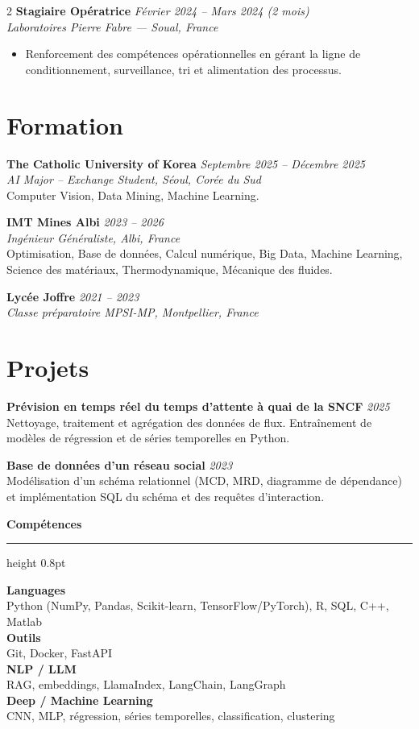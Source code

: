 \documentclass[10.5pt,a4paper]{article}
\newcommand{\sectionrule}{\vspace{-6pt}{\color{accent}\hrule height 1pt}\vspace{3pt}}
\newcommand{\subsectitle}[1]{%
  {\color{accent}\bfseries\large #1}\\[-2pt]
  {\color{accent}\hrule height 0.8pt}\vspace{4pt}
}
\newcommand{\cvexp}[5]{%
  \noindent\textbf{#1} \hfill {\itshape\color{graytext}\small #4}\\
  {\itshape #2 --- #3}\\[-2pt]
  #5
  \vspace{10pt}
}
\newcommand{\cvedu}[5]{%
  \noindent\textbf{#1} \hfill {\itshape\color{graytext}\small #4}\\
  {\itshape #2, #3}\\[1pt]
  {\small #5}
  \vspace{2pt}
}
\newcommand{\cveduplain}[4]{%
  \noindent\textbf{#1} \hfill {\itshape\color{graytext}\small #4}\\
  {\itshape #2, #3}
  \vspace{2pt}
}
\newcommand{\cvproject}[3]{%
  \noindent\textbf{#1} \hfill {\itshape\color{graytext}\small #2}\\[1pt]
  {\small #3}
  \vspace{3pt}
}
\newcommand{\sidebarline}[2]{%
  \noindent\textbf{\small #1}\\
  {\small #2}\\[3pt]
}
\begin{document}
\begin{paracol}{2}
\cvexp{Stagiaire Opératrice}{Laboratoires Pierre Fabre}{Soual, France}{Février 2024 -- Mars 2024 (2 mois)}{%
  \begin{itemize}[leftmargin=12pt, itemsep=2pt, topsep=0pt, partopsep=0pt, parsep=0pt]
    \item Renforcement des compétences opérationnelles en gérant la ligne de conditionnement, surveillance, tri et alimentation des processus.
  \end{itemize}
}

\section*{Formation}
\sectionrule

\cvedu{The Catholic University of Korea}{AI Major -- Exchange Student}{Séoul, Corée du Sud}{Septembre 2025 -- Décembre 2025}{Computer Vision, Data Mining, Machine Learning.}

\cvedu{IMT Mines Albi}{Ingénieur Généraliste}{Albi, France}{2023 -- 2026}{Optimisation, Base de données, Calcul numérique, Big Data, Machine Learning, Science des matériaux, Thermodynamique, Mécanique des fluides.}

\cveduplain{Lycée Joffre}{Classe préparatoire MPSI-MP}{Montpellier, France}{2021 -- 2023}

\section*{Projets}
\sectionrule

\cvproject{Prévision en temps réel du temps d'attente à quai de la SNCF}{2025}{Nettoyage, traitement et agrégation des données de flux. Entraînement de modèles de régression et de séries temporelles en Python.}

\cvproject{Base de données d'un réseau social}{2023}{Modélisation d'un schéma relationnel (MCD, MRD, diagramme de dépendance) et implémentation SQL du schéma et des requêtes d'interaction.}

\switchcolumn

\vspace{2pt}

\subsectitle{Compétences}

\sidebarline{Languages}{Python (NumPy, Pandas, Scikit-learn, TensorFlow/\allowbreak PyTorch), R, SQL, C++, Matlab}
\sidebarline{Outils}{Git, Docker, FastAPI}
\sidebarline{NLP / LLM}{RAG, embeddings, LlamaIndex, LangChain, LangGraph}
\sidebarline{Deep / Machine Learning}{CNN, MLP, régression, séries temporelles, classification, clustering}


\end{paracol}
\end{document}
